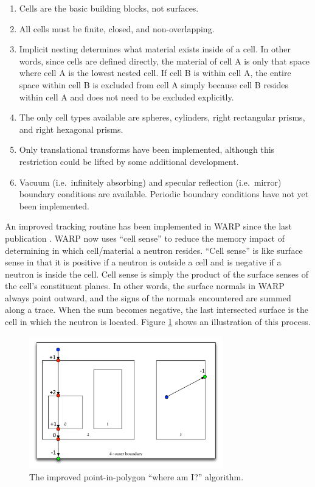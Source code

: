 \documentclass[preprint,12pt]{elsarticle}
\begin{document}
\begin{enumerate}
\item Cells are the basic building blocks, not surfaces.
\item All cells must be finite, closed, and non-overlapping.
\item Implicit nesting determines what material exists inside of a cell.  In other words, since cells are defined directly, the material of cell A is only that space where cell A is the lowest nested cell.  If cell B is within cell A, the entire space within cell B is excluded from cell A simply because cell B resides within cell A and does not need to be excluded explicitly.
\item The only cell types available are spheres, cylinders, right rectangular prisms, and right hexagonal prisms.
\item Only translational transforms have been implemented, although this restriction could be lifted by some additional development.
\item Vacuum (i.e.\ infinitely absorbing) and specular reflection  (i.e.\ mirror) boundary conditions are available.  Periodic boundary conditions have not yet been implemented.
\end{enumerate}

An improved tracking routine has been implemented in WARP since the last publication \cite{algorithms}.  WARP now uses ``cell sense'' to reduce the memory impact of determining in which cell/material a neutron resides.  ``Cell sense'' is like surface sense in that it is positive if a neutron is outside a cell and is negative if a neutron is inside the cell. Cell sense is simply the product of the surface senses of the cell's constituent planes.  In other words, the surface normals in WARP always point outward, and the signs of the normals encountered are summed along a trace.  When the sum becomes negative, the last intersected surface is the cell in which the neutron is located.  Figure \ref{whereami} shows an illustration of this process.

\begin{figure}[h!]
\centering
\includegraphics[width=0.75\textwidth]{graphics/whereami-new.pdf}
\caption{The improved point-in-polygon ``where am I?'' algorithm. \label{whereami} }
\end{figure}
\end{document}
